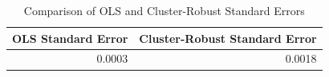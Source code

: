 \begin{table}[ht]
\centering
\begin{tabular}{rr}
  \hline
OLS Standard Error & Cluster-Robust Standard Error \\ 
  \hline
0.0003 & 0.0018 \\ 
   \hline
\end{tabular}
\caption{Comparison of OLS and Cluster-Robust Standard Errors} 
\label{tab:se_comparison_d}
\end{table}
